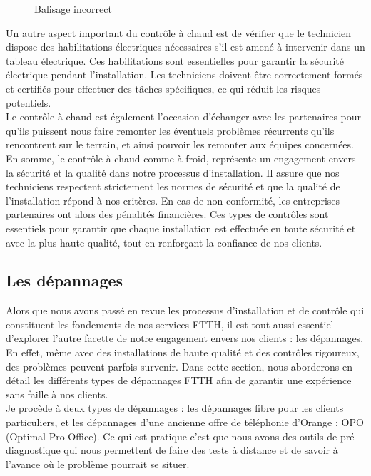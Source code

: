 \documentclass[12pt, a4paper]{article}
\begin{document}
\begin{figure}[htbp]
\begin{minipage}[b]{0.4\textwidth}
      \caption{Balisage incorrect}
    \end{minipage}
\end{figure}

Un autre aspect important du contrôle à chaud est
de vérifier que le technicien dispose des
habilitations électriques nécessaires s'il
est amené à intervenir dans un tableau
électrique. Ces habilitations sont essentielles
pour garantir la sécurité électrique pendant
l'installation. Les techniciens doivent être
correctement formés et certifiés pour effectuer
des tâches spécifiques, ce qui réduit les
risques potentiels.\\

Le contrôle à chaud est également l'occasion
d'échanger avec les partenaires pour qu'ils 
puissent nous faire remonter les éventuels
problèmes récurrents qu'ils rencontrent sur le terrain, 
et ainsi pouvoir les remonter aux équipes concernées.\\

En somme, le contrôle à chaud comme à froid,
représente un engagement envers la sécurité et la qualité
dans notre processus d'installation. Il assure
que nos techniciens respectent strictement
les normes de sécurité et que la qualité de
l'installation répond à nos critères.
En cas de non-conformité, les entreprises 
partenaires ont alors des pénalités financières.
Ces types de contrôles sont essentiels pour garantir
que chaque installation est
effectuée en toute sécurité et avec la plus
haute qualité, tout en renforçant la confiance
de nos clients.


\newpage
\subsection{Les dépannages}
Alors que nous avons passé en revue les processus d'installation et
de contrôle qui constituent les fondements de nos services FTTH,
il est tout aussi essentiel d'explorer l'autre
facette de notre engagement envers nos clients : les dépannages.
En effet, même avec des installations de haute qualité et des
contrôles rigoureux, des problèmes peuvent parfois survenir.
Dans cette section, nous aborderons en détail
les différents types de dépannages FTTH afin de garantir une expérience sans
faille à nos clients.\\

Je procède à deux types de dépannages : les dépannages fibre pour les 
clients particuliers, et les dépannages d'une ancienne offre de téléphonie 
d'Orange : OPO (Optimal Pro Office). Ce qui est pratique c'est que nous 
avons des outils de pré-diagnostique qui nous permettent de faire des tests
à distance et de savoir à l'avance où le problème pourrait se situer.
\end{document}
